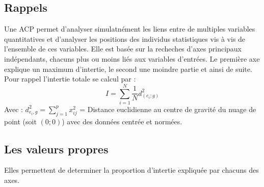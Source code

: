 \documentclass[
]{article}
\newenvironment{Shaded}{\begin{snugshade}}{\end{snugshade}}
\newcommand{\DataTypeTok}[1]{\textcolor[rgb]{0.13,0.29,0.53}{#1}}
\newcommand{\DecValTok}[1]{\textcolor[rgb]{0.00,0.00,0.81}{#1}}
\newcommand{\FloatTok}[1]{\textcolor[rgb]{0.00,0.00,0.81}{#1}}
\newcommand{\KeywordTok}[1]{\textcolor[rgb]{0.13,0.29,0.53}{\textbf{#1}}}
\newcommand{\NormalTok}[1]{#1}
\newcommand{\OperatorTok}[1]{\textcolor[rgb]{0.81,0.36,0.00}{\textbf{#1}}}
\newcommand{\StringTok}[1]{\textcolor[rgb]{0.31,0.60,0.02}{#1}}
\begin{document}
\hypertarget{rappels}{%
\subsection{\texorpdfstring{\textbf{Rappels}}{Rappels}}\label{rappels}}

Une ACP permet d'analyser simulatnément les liens entre de multiples
variables quantitatives et d'analyser les positions des individus
statistiques vis à vis de l'ensemble de ces variables. Elle est basée
sur la recheches d'axes principaux indépendants, chacuns plus ou moins
liés aux variables d'entrées. Le première axe explique un maximum
d'intertie, le second une moindre partie et ainsi de suite. Pour rappel
l'intertie totale se calcul par :
\[I=\sum^N_{i=1}\frac{1}{N}d^2_{(e_i;g)}\] Avec :
\(d^2_{e_i,g}=\sum^p_{j=1}x^2_{ij}\) = Distance euclidienne au centre de
gravité du nuage de point (soit \((0;0)\)) avec des données centrée et
normées.

\hypertarget{les-valeurs-propres}{%
\subsection{\texorpdfstring{\textbf{Les valeurs
propres}}{Les valeurs propres}}\label{les-valeurs-propres}}

Elles permettent de determiner la proportion d'intertie expliquée par
chacuns des axes.

\begin{Shaded}
\end{Shaded}
\end{document}
